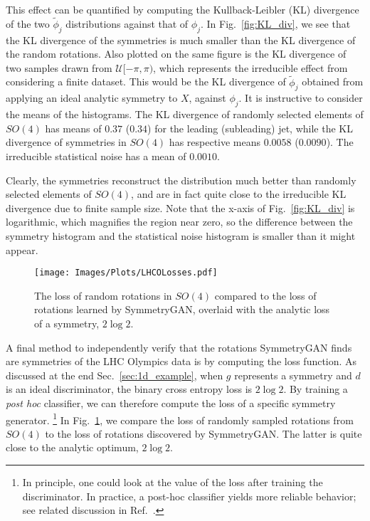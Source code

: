 \documentclass[aps,prx,reprint,preprintnumbers,superscriptaddress,nofootinbib,longbibliography,floatfix]{revtex4-1}
\newcommand{\U}{\mathcal{U}}
\DeclareRobustCommand{\Sec}[1]{Sec.~\ref{sec:#1}}
\DeclareRobustCommand{\Fig}[1]{Fig.~\ref{fig:#1}}
\DeclareRobustCommand{\Ref}[1]{Ref.~\cite{#1}}
\begin{document}
This effect can be quantified by computing the Kullback-Leibler (KL) divergence of the two $\widetilde{\phi}_{j}$ distributions against that of $\phi_{j}$.
%
In \Fig{KL_div}, we see that the KL divergence of the symmetries is much smaller than the KL divergence of the random rotations.
%
Also plotted on the same figure is the KL divergence of two samples drawn from $\U[-\pi, \pi)$, which represents the irreducible effect from considering a finite dataset.
%
This would be the KL divergence of $\widetilde{\phi}_{j}$ obtained from applying an ideal analytic symmetry to $X$, against $\phi_{j}$.
%
It is instructive to consider the means of the histograms.
%
The KL divergence of randomly selected elements of $SO(4)$ has means of $0.37$ ($0.34$) for the leading (subleading) jet, while the KL divergence of symmetries in $SO(4)$ has respective means $0.0058$ ($0.0090$).
%
The irreducible statistical noise has a mean of $0.0010$.
%

Clearly, the symmetries reconstruct the distribution much better than randomly selected elements of $SO(4)$, and are in fact quite close to the irreducible KL divergence due to finite sample size.
%
Note that the x-axis of \Fig{KL_div} is logarithmic, which magnifies the region near zero, so the difference between the symmetry histogram and the statistical noise histogram is smaller than it might appear.

\begin{figure}[t]
    \centering
    \texttt{[image: Images/Plots/LHCOLosses.pdf]}
    \caption{
    The loss of random rotations in $SO(4)$ compared to the loss of rotations learned by SymmetryGAN, overlaid with the analytic loss of a symmetry, $2\log2$.}
    \label{fig:LHCOLosses}
\end{figure}

A final method to independently verify that the rotations SymmetryGAN finds are symmetries of the LHC Olympics data is by computing the loss function.
%
As discussed at the end \Sec{1d_example}, when $g$ represents a symmetry and $d$ is an ideal discriminator, the binary cross entropy loss is $2\log2$.
%
By training a \textit{post hoc} classifier, we can therefore compute the loss of a specific symmetry generator.%
%
\footnote{In principle, one could look at the value of the loss after training the discriminator.  In practice, a post-hoc classifier yields more reliable behavior; see related discussion in \Ref{Diefenbacher:2020rna}.}
%
In \Fig{LHCOLosses}, we compare the loss of randomly sampled rotations from $SO(4)$ to the loss of rotations discovered by SymmetryGAN.
%
The latter is quite close to the analytic optimum, $2\log 2$.
\end{document}
